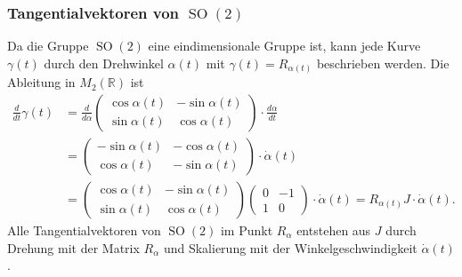\subsubsection{Tangentialvektoren von $\operatorname{SO}(2)$}
Da die Gruppe $\operatorname{SO}(2)$ eine eindimensionale Gruppe
ist, kann jede Kurve $\gamma(t)$ durch den Drehwinkel $\alpha(t)$
mit $\gamma(t) = R_{\alpha(t)}$ beschrieben werden.
Die Ableitung in $M_2(\mathbb{R})$ ist
\begin{align*}
\frac{d}{dt} \gamma(t)
&=
\frac{d}{d\alpha}
\begin{pmatrix}
\cos\alpha(t) & - \sin\alpha(t)\\
\sin\alpha(t) &   \cos\alpha(t)
\end{pmatrix}
\cdot
\frac{d\alpha}{dt}
\\
&=
\begin{pmatrix}
-\sin\alpha(t)&-\cos\alpha(t)\\
 \cos\alpha(t)&-\sin\alpha(t)
\end{pmatrix}
\cdot
\dot{\alpha}(t)
\\
&=
\begin{pmatrix}
\cos\alpha(t) & - \sin\alpha(t)\\
\sin\alpha(t) &   \cos\alpha(t)
\end{pmatrix}
\begin{pmatrix}
0&-1\\
1&0
\end{pmatrix}
\cdot
\dot{\alpha}(t)
=
R_{\alpha(t)}J\cdot\dot{\alpha}(t).
\end{align*}
Alle Tangentialvektoren von $\operatorname{SO}(2)$ im Punkt $R_\alpha$
entstehen aus $J$ durch Drehung mit der Matrix $R_\alpha$ und Skalierung
mit der Winkelgeschwindigkeit $\dot{\alpha}(t)$.
%

